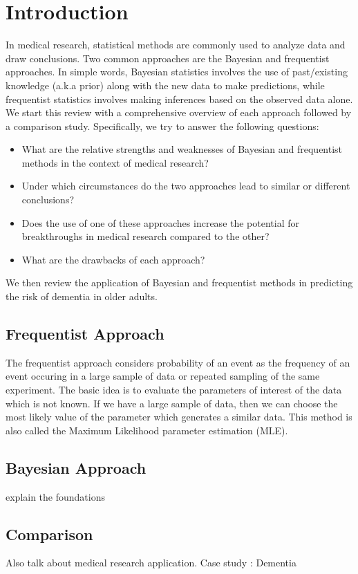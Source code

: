\documentclass[12pt,letterpaper]{article}
\begin{document}
\par
\thispagestyle{firstpage}
\section{Introduction}
In medical research, statistical methods are commonly used to analyze data and draw conclusions. Two common approaches are the Bayesian and frequentist approaches. In simple words, Bayesian statistics involves the use of past/existing knowledge (a.k.a prior) along with the new data to make predictions, while frequentist statistics involves making inferences based on the observed data alone. We start this review with a comprehensive overview of each approach followed by a comparison study. Specifically, we try to answer the following questions:
\begin{itemize}
    \item What are the relative strengths and weaknesses of Bayesian and frequentist methods in the context of medical research?
    \item  Under which circumstances do the two approaches lead to similar or different conclusions?
    \item Does the use of one of these approaches increase the potential for breakthroughs in medical research compared to the other?
    \item What are the drawbacks of each approach?
\end{itemize}
We then review the application of Bayesian and frequentist methods in predicting the risk of dementia in older adults. 
\subsection{Frequentist Approach}

The frequentist approach considers probability of an event as the frequency of an event occuring in a large sample of data or repeated sampling of the same experiment. The basic idea is to evaluate the parameters of interest of the data which is not known. If we have a large sample of data, then we can choose the most likely value of the parameter which generates a similar data. This method is also called the Maximum Likelihood parameter estimation (MLE). 

\subsection{Bayesian Approach}
explain the foundations
\subsection{Comparison}
Also talk about medical research application. Case study : Dementia
\end{document}
